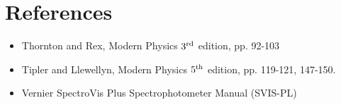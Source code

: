 %
%
%
%
%
%
%
%
%
%
%
%
%
%
%
%

\section{References}

\begin{itemize}
\item Thornton and Rex, Modern Physics $3^{\rm rd}$ edition, pp. 92-103
\item Tipler and Llewellyn, Modern Physics $5^{\rm th}$ edition, pp. 119-121, 147-150.
\item Vernier SpectroVis Plus Spectrophotometer Manual (SVIS-PL)
\end{itemize}
